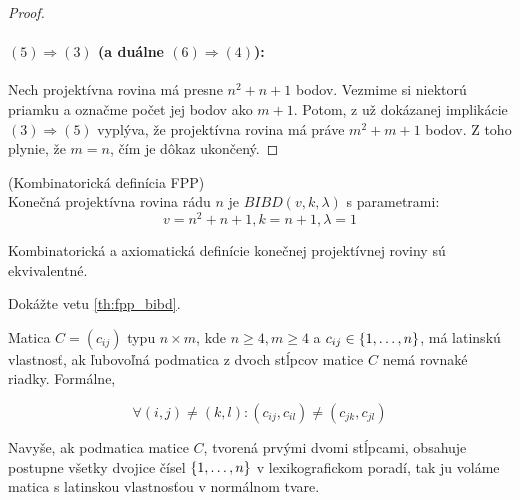\begin{proof}
\paragraph{$(5) \Longrightarrow (3)$ (a duálne $(6) \Longrightarrow (4)$):}
Nech projektívna rovina má presne $n^2 + n + 1$ bodov.
Vezmime si niektorú priamku a označme počet jej bodov ako $m+1$.
Potom, z už dokázanej implikácie $(3) \Longrightarrow (5)$ vyplýva, že projektívna rovina má práve $m^2 + m + 1$ bodov.
Z toho plynie, že $m = n$, čím je dôkaz ukončený.
\end{proof}



\begin{definition}{(Kombinatorická definícia FPP)}\\
Konečná projektívna rovina rádu $n$ je $BIBD(v, k, \lambda)$ s parametrami:
$$v = n^2 + n + 1, k = n + 1, \lambda = 1$$
\end{definition}

\begin{theorem}
\label{th:fpp_bibd}
Kombinatorická a axiomatická definície konečnej projektívnej roviny sú ekvivalentné. 
\end{theorem}


\begin{exercise}
Dokážte vetu \ref{th:fpp_bibd}.
\end{exercise}

\begin{definition}
Matica $C = (c_{ij})$ typu $n \times m$, kde $n \geq 4, m \geq 4$ a $c_{ij} \in \left\{1, \ldots, n\right\}$,  
má latinskú vlastnosť, ak ľubovoľná podmatica z dvoch stĺpcov matice $C$ nemá rovnaké riadky. Formálne,

$$\forall (i, j) \neq (k, l): (c_{ij}, c_{il}) \neq (c_{jk}, c_{jl})$$

Navyše, ak podmatica matice $C$, tvorená prvými dvomi stĺpcami, obsahuje postupne všetky dvojice čísel $\left\{1, \ldots, n\right\}$
v lexikografickom poradí, tak ju voláme matica s latinskou vlastnosťou v normálnom tvare.
\end{definition}

